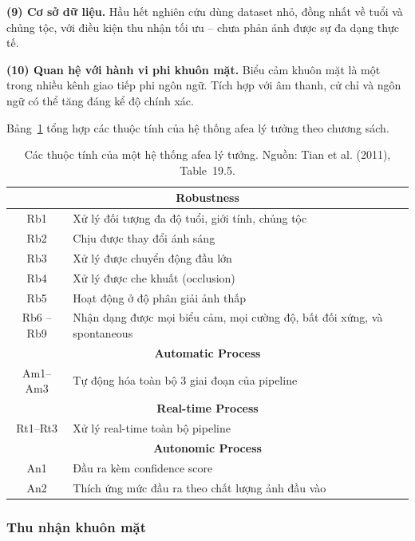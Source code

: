 \documentclass[12pt,a4paper]{article}
\let\oldtextbf\textbf
\renewcommand{\textbf}[1]{\oldtextbf{\textcolor{hcmublue}{#1}}}
\begin{document}
\textbf{(9) Cơ sở dữ liệu.} Hầu hết nghiên cứu dùng dataset nhỏ, đồng nhất về tuổi và chủng tộc, với điều kiện thu nhận tối ưu -- chưa phản ánh được sự đa dạng thực tế.

\textbf{(10) Quan hệ với hành vi phi khuôn mặt.} Biểu cảm khuôn mặt là một trong nhiều kênh giao tiếp phi ngôn ngữ. Tích hợp với âm thanh, cử chỉ và ngôn ngữ có thể tăng đáng kể độ chính xác.

Bảng~\ref{tab:ideal_afea} tổng hợp các thuộc tính của hệ thống \gls{afea} lý tưởng theo chương sách.

\begin{table}[H]
\centering
\small
\begin{tabular}{|c|p{9cm}|}
\hline
\multicolumn{2}{|c|}{\textbf{Robustness}} \\ \hline
Rb1 & Xử lý đối tượng đa độ tuổi, giới tính, chủng tộc \\ \hline
Rb2 & Chịu được thay đổi ánh sáng \\ \hline
Rb3 & Xử lý được chuyển động đầu lớn \\ \hline
Rb4 & Xử lý được che khuất (occlusion) \\ \hline
Rb5 & Hoạt động ở độ phân giải ảnh thấp \\ \hline
Rb6 -- Rb9 & Nhận dạng được mọi biểu cảm, mọi cường độ, bất đối xứng, và spontaneous \\ \hline
\multicolumn{2}{|c|}{\textbf{Automatic Process}} \\ \hline
Am1--Am3 & Tự động hóa toàn bộ 3 giai đoạn của pipeline \\ \hline
\multicolumn{2}{|c|}{\textbf{Real-time Process}} \\ \hline
Rt1--Rt3 & Xử lý real-time toàn bộ pipeline \\ \hline
\multicolumn{2}{|c|}{\textbf{Autonomic Process}} \\ \hline
An1 & Đầu ra kèm confidence score \\ \hline
An2 & Thích ứng mức đầu ra theo chất lượng ảnh đầu vào \\ \hline
\end{tabular}
\caption{Các thuộc tính của một hệ thống \gls{afea} lý tưởng. Nguồn: Tian et al. (2011), Table~19.5.}
\label{tab:ideal_afea}
\end{table}

\subsubsection{Thu nhận khuôn mặt}
\end{document}
